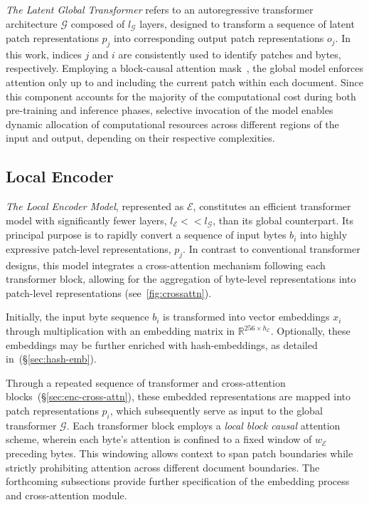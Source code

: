 \textit{The Latent Global Transformer} refers to an autoregressive transformer architecture $\mathcal{G}$ composed of $l_{\mathcal{G}}$ layers, designed to transform a sequence of latent patch representations $p_j$ into corresponding output patch representations $o_j$. In this work, indices $j$ and $i$ are consistently used to identify patches and bytes, respectively. Employing a block-causal attention mask~\citep{dubey2024llama}, the global model enforces attention only up to and including the current patch within each document. Since this component accounts for the majority of the computational cost during both pre-training and inference phases, selective invocation of the model enables dynamic allocation of computational resources across different regions of the input and output, depending on their respective complexities.

\subsection{Local Encoder}
\label{section:local}

\textit{The Local Encoder Model}, represented as $\mathcal{E}$, constitutes an efficient transformer model with significantly fewer layers, $l_{\mathcal{E}} << l_{\mathcal{G}}$, than its global counterpart. Its principal purpose is to rapidly convert a sequence of input bytes $b_i$ into highly expressive patch-level representations, $p_j$. In contrast to conventional transformer designs, this model integrates a cross-attention mechanism following each transformer block, allowing for the aggregation of byte-level representations into patch-level representations (see~\autoref{fig:crossattn}).

Initially, the input byte sequence $b_i$ is transformed into vector embeddings $x_i$ through multiplication with an embedding matrix in $\mathbb{R}^{256 \times h_{\mathcal{E}}}$. Optionally, these embeddings may be further enriched with hash-embeddings, as detailed in~(\S\ref{sec:hash-emb}).

Through a repeated sequence of transformer and cross-attention blocks~(\S\ref{sec:enc-cross-attn}), these embedded representations are mapped into patch representations $p_i$, which subsequently serve as input to the global transformer $\mathcal{G}$. Each transformer block employs a \textit{local block causal} attention scheme, wherein each byte’s attention is confined to a fixed window of $w_{\mathcal{E}}$ preceding bytes. This windowing allows context to span patch boundaries while strictly prohibiting attention across different document boundaries. The forthcoming subsections provide further specification of the embedding process and cross-attention module.


